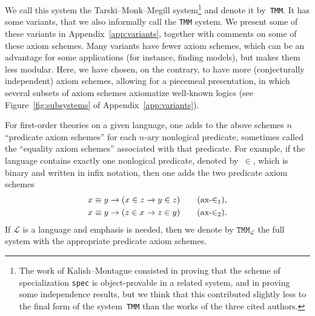 \documentclass[11pt]{article}
\newcommand*{\calL}{\mathcal{L}}
\theoremstyle{plain}
\theoremstyle{definition}
\theoremstyle{remark}
\begin{document}
We call this system the Tarski--Monk--Megill system\footnote{
The work of Kalish--Montague consisted in proving that the scheme of specialization \texttt{spec}
is object-provable in a related system, and in proving some independence results, but we think
that this contributed slightly less to the final form of the system~\texttt{TMM} than the works
of the three cited authors.}
and denote it by~\texttt{TMM}.
It has some variants, that we also informally call the \texttt{TMM} system.
We present some of these variants in Appendix~\ref{app:variants}, together with comments on some of
these axiom schemes.
Many variants have fewer axiom schemes, which can be an advantage for some applications (for
instance, finding models), but makes them less modular.
Here, we have chosen, on the contrary, to have more (conjecturally independent) axiom schemes,
allowing for a piecemeal presentation, in which several subsets of axiom schemes axiomatize
well-known logics (see Figure~\ref{fig:subsystems} of Appendix~\ref{app:variants}).

For first-order theories on a given language, one adds to the above schemes $n$ ``predicate axiom
schemes'' for each $n$-ary nonlogical predicate, sometimes called the ``equality axiom schemes''
associated with that predicate.
For example, if the language contains exactly one nonlogical predicate, denoted by~$\in$, which is
binary and written in infix notation, then one adds the two predicate axiom schemes
\begin{gather}
x \equiv y \to (x \in z \to y \in z) \tag{\texttt{ax-$\in_1$}},\\
x \equiv y \to (z \in x \to z \in y) \tag{\texttt{ax-$\in_2$}}.
\end{gather}
If $\calL$ is a language and emphasis is needed, then we denote by $\texttt{TMM}_\calL$ the full
system with the appropriate predicate axiom schemes.
\end{document}
